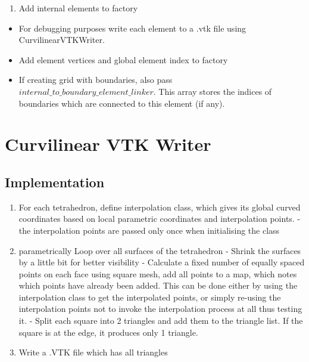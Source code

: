 \documentclass[12pt]{article}
\begin{document}
\begin{enumerate}[resume]
	\item Add internal elements to factory
\end{enumerate}
\begin{mybox}
	\begin{itemize}
		\item For debugging purposes write each element to a .vtk file using CurvilinearVTKWriter.
		\item Add element vertices and global element index to factory
		\item If creating grid with boundaries, also pass $internal\_to\_boundary\_element\_linker$. This array stores the indices of boundaries which are connected to this element (if any).
	\end{itemize}
\end{mybox}




















\section{Curvilinear VTK Writer}

\subsection{Implementation}

\begin{enumerate}
  \item For each tetrahedron, define interpolation class, which gives its global curved coordinates based on local parametric coordinates and interpolation points.
      \subitem - the interpolation points are passed only once when initialising the class
  \item parametrically Loop over all surfaces of the tetrahedron
      \subitem - Shrink the surfaces by a little bit for better visibility
      \subitem - Calculate a fixed number of equally spaced points on each face using square mesh, add all points to a map, which notes which points have already been added. This can be done either by using the interpolation class to get the interpolated points, or simply re-using the interpolation points not to invoke the interpolation process at all thus testing it.
      \subitem - Split each square into 2 triangles and add them to the triangle list. If the square is at the edge, it produces only 1 triangle.
  \item Write a .VTK file which has all triangles
\end{enumerate}
\end{document}
